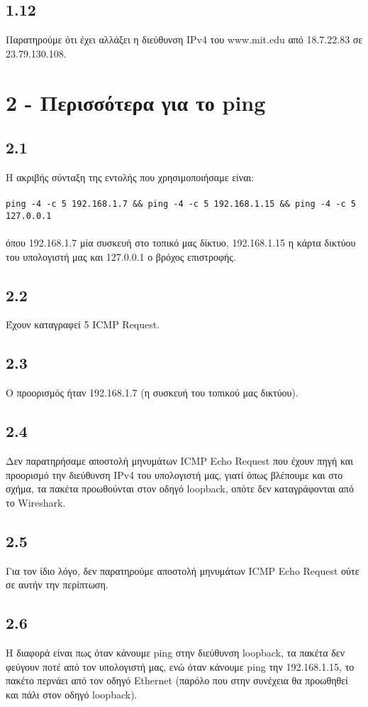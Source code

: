 		\subsection*{1.12}
			Παρατηρούμε ότι έχει αλλάξει η διεύθυνση IPv4 του www.mit.edu από 18.7.22.83 σε 23.79.130.108.

	\section*{2 - Περισσότερα για το ping}

		\subsection*{2.1}
			Η ακριβής σύνταξη της εντολής που χρησιμοποιήσαμε είναι: \\~\\
			\verb|ping -4 -c 5 192.168.1.7 && ping -4 -c 5 192.168.1.15 && ping -4 -c 5 127.0.0.1|
			\\~\\
			όπου 192.168.1.7 μία συσκευή στο τοπικό μας δίκτυο, 192.168.1.15 η κάρτα δικτύου του υπολογιστή μας και 127.0.0.1 ο βρόχος επιστροφής.

		\subsection*{2.2}
			Έχουν καταγραφεί 5 ICMP Request. 
			
		\subsection*{2.3}
			Ο προορισμός ήταν 192.168.1.7 (η συσκευή του τοπικού μας δικτύου).

		\subsection*{2.4}
			Δεν παρατηρήσαμε αποστολή μηνυμάτων ICMP Echo Request που έχουν πηγή και προορισμό την διεύθυνση IPv4 του υπολογιστή μας, γιατί όπως βλέπουμε και στο σχήμα, τα πακέτα προωθούνται στον οδηγό loopback, οπότε δεν καταγράφονται από το Wireshark.

		\subsection*{2.5}
			Για τον ίδιο λόγο, δεν παρατηρούμε αποστολή μηνυμάτων ICMP Echo Request ούτε σε αυτήν την περίπτωση.

		\subsection*{2.6}
			Η διαφορά είναι πως όταν κάνουμε ping στην διεύθυνση loopback, τα πακέτα δεν φεύγουν ποτέ από τον υπολογιστή μας, ενώ όταν κάνουμε ping την 192.168.1.15, το πακέτο περνάει από τον οδηγό Ethernet (παρόλο που στην συνέχεια θα προωθηθεί και πάλι στον οδηγό loopback).

